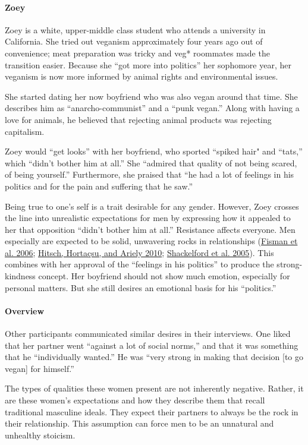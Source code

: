 \paragraph{Zoey}

Zoey is a white, upper-middle class student who attends a university in California. She tried out veganism approximately four years ago out of convenience; meat preparation was tricky and veg* roommates made the transition easier. Because she ``got more into politics'' her sophomore year, her veganism is now more informed by animal rights and environmental issues.

She started dating her now boyfriend who was also vegan around that time. She describes him as ``anarcho-communist'' and a ``punk vegan.'' Along with having a love for animals, he believed that rejecting animal products was rejecting capitalism.

Zoey would ``get looks'' with her boyfriend, who sported ``spiked hair" and ``tats,'' which ``didn't bother him at all.'' She ``admired that quality of not being scared, of being yourself.'' Furthermore, she praised that ``he had a lot of feelings in his politics and for the pain and suffering that he saw.''

Being true to one's self is a trait desirable for any gender. However, Zoey crosses the line into unrealistic expectations for men by expressing how it appealed to her that opposition ``didn't bother him at all.'' Resistance affects everyone. Men especially are expected to be solid, unwavering rocks in relationships (\hyperlink{fisman}{Fisman et al. 2006}; \hyperlink{hitsch2}{Hitsch, Hortaçsu, and Ariely 2010}; \hyperlink{shackelford}{Shackelford et al. 2005}). This combines with her approval of the ``feelings in his politics'' to produce the strong-kindness concept. Her boyfriend should not show much emotion, especially for personal matters. But she still desires an emotional basis for his ``politics.''

\paragraph{Overview}

Other participants communicated similar desires in their interviews. One liked that her partner went ``against a lot of social norms,'' and that it was something that he ``individually wanted.'' He was ``very strong
in making that decision {[}to go vegan{]} for himself.''

The types of qualities these women present are not inherently negative. Rather, it are these women's expectations and how they describe them that recall traditional masculine ideals. They expect their partners to always be the rock in their relationship. This assumption can force men
to be an unnatural and unhealthy stoicism.

